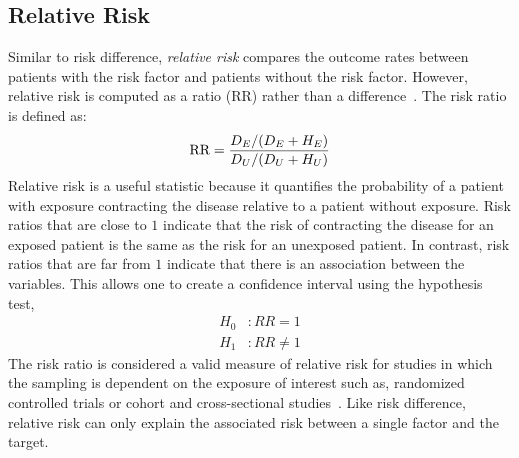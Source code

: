 \subsection{Relative Risk}\label{subsec:relative-risk}
Similar to risk difference, \emph{relative risk} compares the outcome rates between patients with the risk factor and patients without the risk factor.
However, relative risk is computed as a ratio (RR) rather than a difference~\citep{Statistical-hypothesis-testing}.
The risk ratio is defined as:
\begin{align*}
 \text{RR} = \frac{D_{E} / (D_{E} + H_{E})}{D_{U} / (D_{U} + H_{U})}
\end{align*}
Relative risk is a useful statistic because it quantifies the probability of a patient with exposure contracting the disease relative to a patient without exposure.
Risk ratios that are close to $1$ indicate that the risk of contracting the disease for an exposed patient is the same as the risk for an unexposed patient.
In contrast, risk ratios that are far from $1$ indicate that there is an association between the variables.
This allows one to create a confidence interval using the hypothesis test,
\begin{align*}
    H_0&: RR = 1 \\
    H_1&: RR \neq 1
\end{align*}
The risk ratio is considered a valid measure of relative risk for studies in which the sampling is dependent on the exposure of interest such as, randomized controlled trials or cohort and cross-sectional studies~\citep{Relative-Measures-of-Association-for-Binary-Outcomes}.
Like risk difference, relative risk can only explain the associated risk between a single factor and the target.


